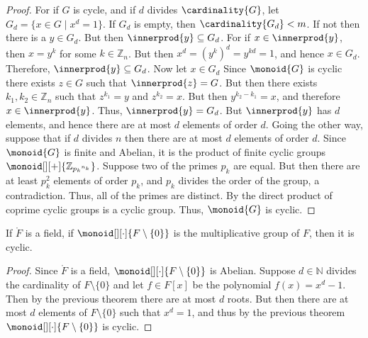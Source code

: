 \documentclass{article}                                                        %
\begin{document}
        \begin{proof}
            For if $G$ is cycle, and if $d$ divides $\cardinality{G}$, let
            $G_{d}=\{x\in{G}\;|\;x^{d}=1\}$. If $G_{d}$ is empty, then
            $\cardinality{G_{d}}<m$. If not then there is a $y\in{G}_{d}$.
            But then $\innerprod{y}\subseteq{G}_{d}$. For if
            $x\in\innerprod{y}$, then $x=y^{k}$ for some $k\in\mathbb{Z}_{n}$.
            But then $x^{d}=(y^{k})^{d}=y^{kd}=1$, and hence $x\in{G}_{d}$.
            Therefore, $\innerprod{y}\subseteq{G}_{d}$. Now let $x\in{G}_{d}$
            Since $\monoid{G}$ is cyclic there exists $z\in{G}$ such that
            $\innerprod{z}=G$. But then there exists
            $k_{1},k_{2}\in\mathbb{Z}_{n}$ such that $z^{k_{1}}=y$ and
            $z^{k_{2}}=x$. But then $y^{k_{2}-k_{1}}=x$, and therefore
            $x\in\innerprod{y}$. Thus, $\innerprod{y}=G_{d}$. But
            $\innerprod{y}$ has $d$ elements, and hence there are at most $d$
            elements of order $d$. Going the other way, suppose that if $d$
            divides $n$ then there are at most $d$ elements of order $d$.
            Since $\monoid{G}$ is finite and Abelian, it is the product of
            finite cyclic groups $\monoid[][+]{\mathbb{Z}_{{p_{k}}^{n_{k}}}}$.
            Suppose two of the primes $p_{k}$ are equal. But then there are at
            least $p_{k}^{2}$ elements of order $p_{k}$, and $p_{k}$ divides the
            order of the group, a contradiction. Thus, all of the primes are
            distinct. By the direct product of coprime cyclic groups is a cyclic
            group. Thus, $\monoid{G}$ is cyclic.
        \end{proof}
        \begin{theorem}
            If $\ring{F}$ is a field, if $\monoid[][\cdot]{F\setminus\{0\}}$ is
            the multiplicative group of $F$, then it is cyclic.
        \end{theorem}
        \begin{proof}
            Since $\ring{F}$ is a field, $\monoid[][\cdot]{F\setminus\{0\}}$ is
            Abelian. Suppose $d\in\mathbb{N}$ divides the cardinality of
            $F\setminus\{0\}$ and let $f\in{F}[x]$ be the polynomial
            $f(x)=x^{d}-1$. Then by the previous theorem there are at most
            $d$ roots. But then there are at most $d$ elements of
            $F\setminus\{0\}$ such that $x^{d}=1$, and thus by the previous
            theorem $\monoid[][\cdot]{F\setminus\{0\}}$ is cyclic.
        \end{proof}
\end{document}
